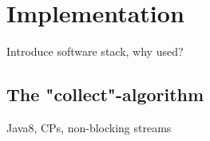 \chapter{Implementation}

Introduce software stack, why used?

\section{The "collect"-algorithm}

Java8, CPs, non-blocking streams


